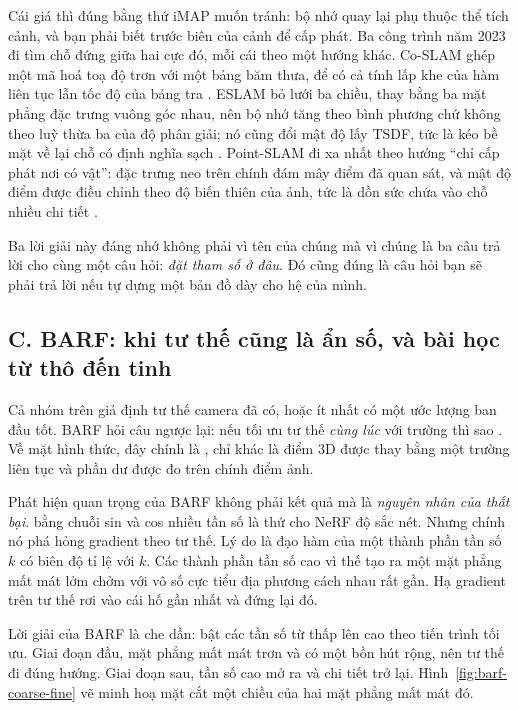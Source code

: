 \documentclass[../../deep_learning.tex]{subfiles}
\begin{document}
Cái giá thì đúng bằng thứ iMAP muốn tránh: bộ nhớ quay lại phụ thuộc thể tích cảnh, và bạn phải biết trước biên của cảnh để cấp phát. Ba công trình năm 2023 đi tìm chỗ đứng giữa hai cực đó, mỗi cái theo một hướng khác. Co-SLAM ghép một mã hoá toạ độ trơn với một bảng băm thưa, để có cả tính lấp khe của hàm liên tục lẫn tốc độ của bảng tra \cite{f32coslam2023}. ESLAM bỏ lưới ba chiều, thay bằng ba mặt phẳng đặc trưng vuông góc nhau, nên bộ nhớ tăng theo bình phương chứ không theo luỹ thừa ba của độ phân giải; nó cũng đổi mật độ lấy TSDF, tức là kéo bề mặt về lại chỗ có định nghĩa sạch \cite{f32eslam2023}. Point-SLAM đi xa nhất theo hướng ``chỉ cấp phát nơi có vật'': đặc trưng neo trên chính đám mây điểm đã quan sát, và mật độ điểm được điều chỉnh theo độ biến thiên của ảnh, tức là dồn sức chứa vào chỗ nhiều chi tiết \cite{f32pointslam2023}.

Ba lời giải này đáng nhớ không phải vì tên của chúng mà vì chúng là ba câu trả lời cho cùng một câu hỏi: \emph{đặt tham số ở đâu}. Đó cũng đúng là câu hỏi bạn sẽ phải trả lời nếu tự dựng một bản đồ dày cho hệ của mình.

\subsection{C. BARF: khi tư thế cũng là ẩn số, và bài học từ thô đến tinh}
Cả nhóm trên giả định tư thế camera đã có, hoặc ít nhất có một ước lượng ban đầu tốt. BARF hỏi câu ngược lại: nếu tối ưu tư thế \emph{cùng lúc} với trường thì sao \cite{f32barf2021}. Về mặt hình thức, đây chính là , chỉ khác là điểm 3D được thay bằng một trường liên tục và phần dư được đo trên chính điểm ảnh.

Phát hiện quan trọng của BARF không phải kết quả mà là \emph{nguyên nhân của thất bại}.  bằng chuỗi sin và cos nhiều tần số là thứ cho NeRF độ sắc nét. Nhưng chính nó phá hỏng gradient theo tư thế. Lý do là đạo hàm của một thành phần tần số \(k\) có biên độ tỉ lệ với \(k\). Các thành phần tần số cao vì thế tạo ra một mặt phẳng mất mát lởm chởm với vô số cực tiểu địa phương cách nhau rất gần. Hạ gradient trên tư thế rơi vào cái hố gần nhất và đứng lại đó.

Lời giải của BARF là che dần: bật các tần số từ thấp lên cao theo tiến trình tối ưu. Giai đoạn đầu, mặt phẳng mất mát trơn và có một bồn hút rộng, nên tư thế đi đúng hướng. Giai đoạn sau, tần số cao mở ra và chi tiết trở lại. Hình~\ref{fig:barf-coarse-fine} vẽ minh hoạ mặt cắt một chiều của hai mặt phẳng mất mát đó.
\end{document}
